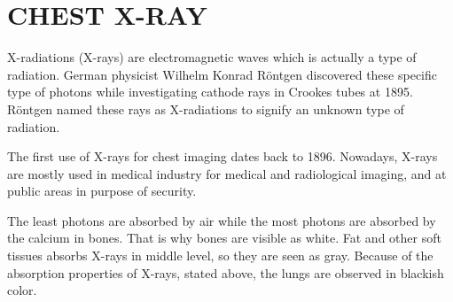 \chapter{CHEST X-RAY}\label{ch:CH2}

X-radiations (X-rays) are electromagnetic waves which is actually a type of radiation. German physicist Wilhelm Konrad Röntgen discovered these specific type of photons while investigating cathode rays in Crookes tubes at 1895. Röntgen named these rays as X-radiations to signify an unknown type of radiation.

The first use of X-rays for chest imaging dates back to 1896. Nowadays, X-rays are mostly used in medical industry for medical and radiological imaging, and at public areas in purpose of security. 

The least photons are absorbed by air while the most photons are absorbed by the calcium in bones. That is why bones are visible as white. Fat and other soft tissues absorbs X-rays in middle level, so they are seen as gray. Because of the absorption properties of X-rays, stated above, the lungs are observed in blackish color.

